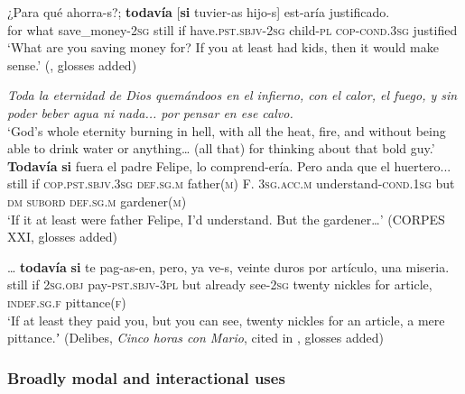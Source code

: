 \begin{exe}
	\ex\label{exAppendixSpanishTodaviaIfOnly1}
	\gll ¿Para qué ahorra-s?; \textbf{todavía} \textup{[}\textbf{si} tuvier-as hijo-s\textup{]} est-aría justificado.\\
	for what save\_money-2\textsc{sg} still \phantom{[}if have.\textsc{pst}.\textsc{sbjv}-2\textsc{sg} child-\textsc{pl} \textsc{cop}-\textsc{cond}.3\textsc{sg} justified\\
	\glt \lq What are you saving money for? If you at least had kids, then it would make sense.' (\cite[s.v. todavía]{RAEDictionary}, glosses added)
	
	\ex\label{exAppendixSpanishTodaviaIfOnly2}
\textit{	Toda la eternidad de Dios quemándoos en el infierno, con el  calor, el fuego, y sin poder beber agua ni nada... por pensar en ese calvo.}\\
	\lq God's whole eternity burning in hell, with all the heat, fire, and without being able to drink water or anything… (all that) for thinking about that bold guy.'
	\exi{}\gll \textbf{Todavía} \textbf{si} fuera el padre Felipe, lo comprend-ería. Pero 
anda que el huertero...\\
still if \textsc{cop}.\textsc{pst}.\textsc{sbjv}.3\textsc{sg} \textsc{def}.\textsc{sg}.\textsc{m} father(\textsc{m}) F. 3\textsc{sg}.\textsc{acc}.\textsc{m} understand-\textsc{cond}.1\textsc{sg} but \textsc{dm} \textsc{subord} \textsc{def}.\textsc{sg}.\textsc{m} gardener(\textsc{m})\\
\glt \lq If it at least were father Felipe, I'd understand. But the gardener…' (CORPES XXI, glosses added)

	\ex\label{exAppendixSpanishTodaviaIfOnly4}
	 \gll … \textbf{todavía} \textbf{si} te pag-as-en, pero, ya ve-s, veinte duros por artículo, una miseria.\\
	{} still if 2\textsc{sg}.\textsc{obj} pay-\textsc{pst}.\textsc{sbjv}-3\textsc{pl} but already see-2\textsc{sg} twenty nickles for article, \textsc{indef}.\textsc{sg}.\textsc{f} pittance(\textsc{f})\\
	\glt \lq If at least they paid you, but you can see, twenty nickles for an article, a mere pittance.ʼ (Delibes, \textit{Cinco horas con Mario}, cited in \cite[222]{Bosque2016}, glosses added)
\end{exe}

\subsubsection{Broadly modal and interactional uses}
